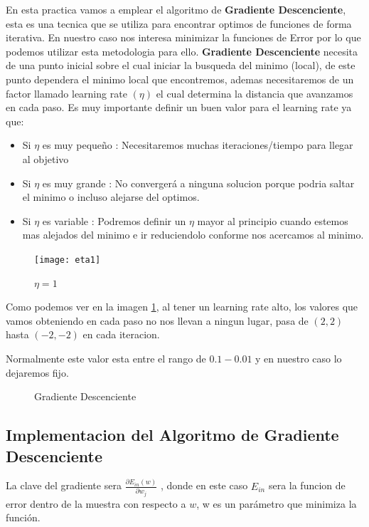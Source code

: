 En esta practica vamos a emplear el algoritmo de \textbf{Gradiente Descenciente}, 
esta es una tecnica que se utiliza para encontrar optimos de funciones de forma iterativa.
En nuestro caso nos interesa minimizar la funciones de Error por lo que podemos utilizar esta metodologia para ello.
\textbf{Gradiente Descenciente} necesita de una punto inicial sobre el cual iniciar la busqueda del 
minimo (local), de este punto dependera el minimo local que encontremos, ademas necesitaremos 
de un factor llamado learning rate $( \eta ) $ el cual determina la distancia que avanzamos en cada paso.
Es muy importante definir un buen valor para el learning rate ya que:
\begin{itemize}
  \item Si $\eta$ es muy pequeño : Necesitaremos muchas iteraciones/tiempo para llegar al objetivo
  \item Si $\eta$ es muy grande : No convergerá a ninguna solucion porque podria saltar el minimo o incluso alejarse del optimos.
  \item Si $\eta$ es variable : Podremos definir un $\eta$ mayor al principio cuando estemos mas alejados del minimo e ir reduciendolo conforme nos acercamos al minimo.
\end{itemize}

\begin{figure}[h]
  \centering
  \texttt{[image: eta1]}
  \caption{$\eta = 1$}
  \label{fig:eta1}
\end{figure}
Como podemos ver en la imagen \ref{fig:eta1}, al tener un learning rate alto, los valores que vamos obteniendo en cada
paso no nos llevan a ningun lugar, pasa de $(2,2)$ hasta $(-2,-2)$ en cada iteracion.

Normalmente este valor esta entre el rango de $ 0.1 - 0.01$ y en nuestro caso lo dejaremos fijo.
\newpage
\begin{figure}
  \centering
  \caption{Gradiente Descenciente}
  \label{f:Pruebas_gradiente}
 \end{figure}


 
 
\subsection{Implementacion del Algoritmo de Gradiente Descenciente}

La clave del gradiente sera $ \frac{\partial E_{in}(w)}{\partial w_j}$ , donde en este caso $E_{in}$ sera la funcion de error dentro de la muestra 
con respecto a $w$, w es un parámetro que minimiza la función. 

